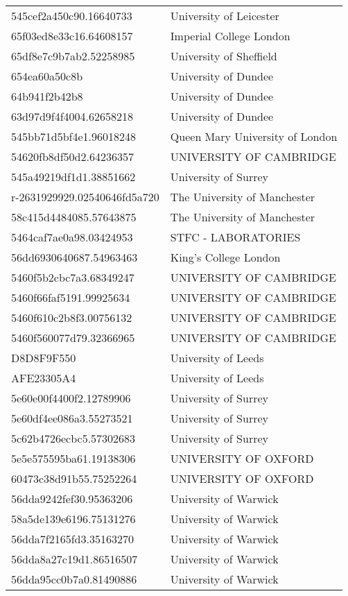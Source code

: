 \begin{tabular}{ll}
545cef2a450c90.16640733 & University of Leicester \\
65f03ed8e33c16.64608157 & Imperial College London \\
65df8e7c9b7ab2.52258985 & University of Sheffield \\
654ea60a50c8b & University of Dundee \\
64b941f2b42b8 & University of Dundee \\
63d97d9f4f4004.62658218 & University of Dundee \\
545bb71d5bf4e1.96018248 & Queen Mary University of London \\
54620fb8df50d2.64236357 & UNIVERSITY OF CAMBRIDGE \\
545a49219df1d1.38851662 & University of Surrey \\
r-2631929929.02540646fd5a720 & The University of Manchester \\
58c415d4484085.57643875 & The University of Manchester \\
5464caf7ae0a98.03424953 & STFC - LABORATORIES \\
56dd6930640687.54963463 & King's College London \\
5460f5b2cbc7a3.68349247 & UNIVERSITY OF CAMBRIDGE \\
5460f66faf5191.99925634 & UNIVERSITY OF CAMBRIDGE \\
5460f610c2b8f3.00756132 & UNIVERSITY OF CAMBRIDGE \\
5460f560077d79.32366965 & UNIVERSITY OF CAMBRIDGE \\
D8D8F9F550 & University of Leeds \\
AFE23305A4 & University of Leeds \\
5e60e00f4400f2.12789906 & University of Surrey \\
5e60df4ee086a3.55273521 & University of Surrey \\
5c62b4726ecbc5.57302683 & University of Surrey \\
5e5e575595ba61.19138306 & UNIVERSITY OF OXFORD \\
60473c38d91b55.75252264 & UNIVERSITY OF OXFORD \\
56dda9242fef30.95363206 & University of Warwick \\
58a5de139e6196.75131276 & University of Warwick \\
56dda7f2165fd3.35163270 & University of Warwick \\
56dda8a27c19d1.86516507 & University of Warwick \\
56dda95cc0b7a0.81490886 & University of Warwick \\

\end{tabular}
